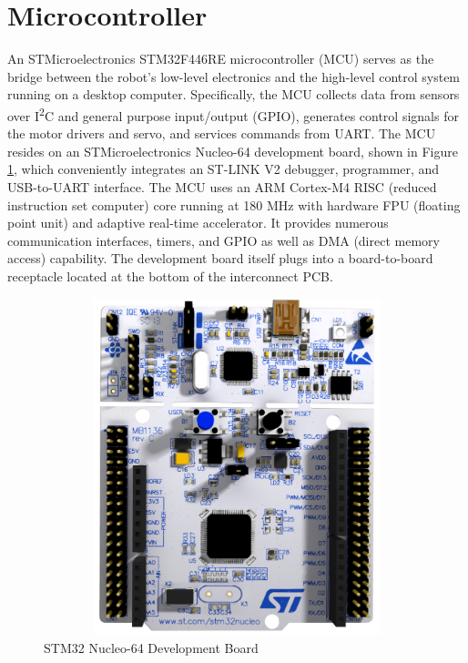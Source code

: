 \section{Microcontroller}
An STMicroelectronics STM32F446RE microcontroller (MCU) serves as the bridge between the robot's low-level electronics and the high-level control system running on a desktop computer. Specifically, the MCU collects data from sensors over I\textsuperscript{2}C and general purpose input/output (GPIO), generates control signals for the motor drivers and servo, and services commands from UART. The MCU resides on an STMicroelectronics Nucleo-64 development board, shown in Figure \ref{fig:nucleo64}, which conveniently integrates an ST-LINK V2 debugger, programmer, and USB-to-UART interface. The MCU uses an ARM Cortex-M4 RISC (reduced instruction set computer) core running at 180 MHz with hardware FPU (floating point unit) and adaptive real-time accelerator. It provides numerous communication interfaces, timers, and GPIO as well as DMA (direct memory access) capability. The development board itself plugs into a board-to-board receptacle located at the bottom of the interconnect PCB.

\begin{figure}[H]   %
	\centering \includegraphics[width=6in, height=3.85in, keepaspectratio]{figures/nucleo64.png}
	\caption{STM32 Nucleo-64 Development Board \cite{nucleo64_manual}}\label{fig:nucleo64}
\end{figure}


